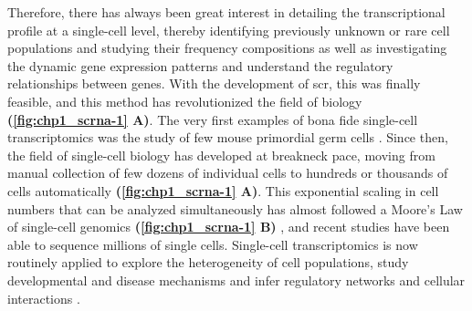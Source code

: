 \par Therefore, there has always been great interest in detailing the transcriptional profile at a single-cell level, thereby identifying previously unknown or rare cell populations and studying their frequency compositions as well as investigating the dynamic gene expression patterns and understand the regulatory relationships between genes. With the development of \acrfull{scr}, this was finally feasible, and this method has revolutionized the field of biology \textbf{(\autoref{fig:chp1_scrna-1} A)}. The very first examples of bona fide single-cell transcriptomics was the study of few mouse primordial germ cells \textbf{\cite{tang_mrna-seq_2009}}. Since then, the field of single-cell biology has developed at breakneck pace, moving from manual collection of few dozens of individual cells to hundreds or thousands of cells automatically \textbf{(\autoref{fig:chp1_scrna-1} A)}. This exponential scaling in cell numbers that can be analyzed simultaneously has almost followed a Moore’s Law of single-cell genomics \textbf{(\autoref{fig:chp1_scrna-1} B)} \textbf{\cite{aldridge_single_2020}}, and recent studies have been able to sequence millions of single cells. Single-cell transcriptomics is now routinely applied to explore the heterogeneity of cell populations, study developmental \textbf{\cite{cao_single-cell_2019,la_manno_molecular_2021}} and disease mechanisms \textbf{\cite{jordao_single-cell_2019,he_single-cell_2021}} and infer regulatory networks \textbf{\cite{wang_cell-type-specific_2020,fei_systematic_2022}} and cellular interactions \textbf{\cite{cherry_computational_2021,shamsi_comprehensive_2023}}. 


